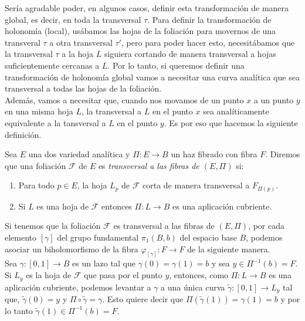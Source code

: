 Sería agradable poder, en algunos casos, definir esta transformación de manera global, es decir, en toda la transversal $\tau$. Para definir la transformación de holonomía (local), usábamos las hojas de la foliación para movernos de una transveral $\tau$ a otra transversal $\tau'$, pero para poder hacer esto, necesitábamos que la transversal $\tau$ a la hoja $L$ siguiera cortando de manera transversal a hojas suficientemente cercanas a $L$. Por lo tanto, si queremos definir una transformación de holonomía global vamos a necesitar una curva analítica que sea transversal a todas las hojas de la foliación.\\

Además, vamos a necesitar que, cuando nos movamos de un punto $x$ a un punto $y$ en una misma hoja $L$, la transversal a $L$ en el punto $x$ sea analíticamente equivalente a la tansversal a $L$ en el punto $y$. Es por eso que hacemos la siguiente definición.

\begin{defn}
\label{Def:FoliacionTransversal}
Sea $E$ una dos variedad analítica y $\Pi\colon E\rightarrow B$ un haz fibrado con fibra $F$. Diremos que una foliación $\mathcal{F}$ de $E$ es \emph{transversal a las fibras de $(E,\Pi)$} si:
\begin{enumerate}
\item Para todo $p\in E$, la hoja $L_{p}$ de $\mathcal{F}$ corta de manera transversal a $F_{\Pi(p)}$.

\item Si $L$ es una hoja de $\mathcal{F}$ entonces $\Pi\colon L\rightarrow B$ es una aplicación cubriente.
\end{enumerate}
\end{defn}

Si tenemos que la foliación $\mathcal{F}$ es transversal a las fibras de $(E,\Pi)$, por cada elemento $[\gamma]$ del grupo fundamental $\pi_{1}(B,b)$ del espacio base $B$, podemos asociar un biholomorfismo de la fibra $\varphi_{[\gamma]}\colon F\rightarrow F$ de la siguiente manera.\\

Sea $\gamma\colon [0,1]\rightarrow B$ es un lazo tal que $\gamma(0)=\gamma(1)=b$ y sea $y\in\Pi^{-1}(b)=F$. Si $L_{y}$ es la hoja de $\mathcal{F}$ que pasa por el punto $y$, entonces, como $\Pi\colon L \rightarrow B $ es una aplicación cubriente, podemos levantar a $\gamma$ a una única curva $\tilde{\gamma}\colon [0,1] \rightarrow L_{y}$ tal que, $\tilde{\gamma}(0)=y$ y $\Pi\circ\tilde{\gamma}=\gamma$. Esto quiere decir que $\Pi(\tilde{\gamma}(1))=\gamma(1)=b$ y por lo tanto $\tilde{\gamma}(1)\in\Pi^{-1}(b)=F$.\\

